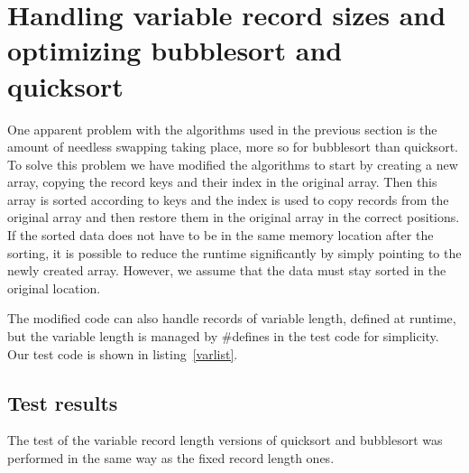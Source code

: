 \section{Handling variable record sizes and optimizing bubblesort and quicksort}
One apparent problem with the algorithms used in the previous section is the amount of needless swapping taking place, more so
for bubblesort than quicksort. To solve this problem we have modified the algorithms to start by creating a new array, copying 
the record keys and their index in the original array. Then this array is sorted according to keys and the index is used to copy 
records from the original array and then restore them in the original array in the correct positions. If the sorted data does not have
to be in the same memory location after the sorting, it is possible to reduce the runtime significantly by simply pointing to the newly
created array. However, we assume that the data must stay sorted in the original location.

The modified code can also handle records of variable length, defined at runtime, but the variable length is managed by \#defines
in the test code for simplicity. Our test code is shown in listing~\ref{varlist}. 
\subsection{Test results}
The test of the variable record length versions of quicksort and bubblesort was performed in the same way as the fixed record length ones.
